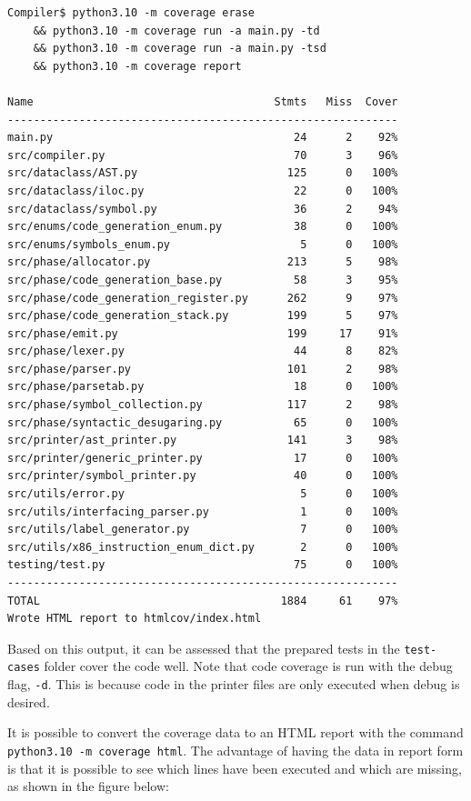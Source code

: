 \begin{verbatim}
Compiler$ python3.10 -m coverage erase
    && python3.10 -m coverage run -a main.py -td
    && python3.10 -m coverage run -a main.py -tsd 
    && python3.10 -m coverage report 

Name                                     Stmts   Miss  Cover
------------------------------------------------------------
main.py                                     24      2    92%
src/compiler.py                             70      3    96%
src/dataclass/AST.py                       125      0   100%
src/dataclass/iloc.py                       22      0   100%
src/dataclass/symbol.py                     36      2    94%
src/enums/code_generation_enum.py           38      0   100%
src/enums/symbols_enum.py                    5      0   100%
src/phase/allocator.py                     213      5    98%
src/phase/code_generation_base.py           58      3    95%
src/phase/code_generation_register.py      262      9    97%
src/phase/code_generation_stack.py         199      5    97%
src/phase/emit.py                          199     17    91%
src/phase/lexer.py                          44      8    82%
src/phase/parser.py                        101      2    98%
src/phase/parsetab.py                       18      0   100%
src/phase/symbol_collection.py             117      2    98%
src/phase/syntactic_desugaring.py           65      0   100%
src/printer/ast_printer.py                 141      3    98%
src/printer/generic_printer.py              17      0   100%
src/printer/symbol_printer.py               40      0   100%
src/utils/error.py                           5      0   100%
src/utils/interfacing_parser.py              1      0   100%
src/utils/label_generator.py                 7      0   100%
src/utils/x86_instruction_enum_dict.py       2      0   100%
testing/test.py                             75      0   100%
------------------------------------------------------------
TOTAL                                     1884     61    97%
Wrote HTML report to htmlcov/index.html
\end{verbatim}

Based on this output, it can be assessed that the prepared tests in the \texttt{test-cases} folder cover the code well. Note that code coverage is run with the debug flag, \texttt{-d}. This is because code in the printer files are only executed when debug is desired.

It is possible to convert the coverage data to an HTML report with the command \texttt{python3.10 -m coverage html}. The advantage of having the data in report form is that it is possible to see which lines have been executed and which are missing, as shown in the figure below: 

